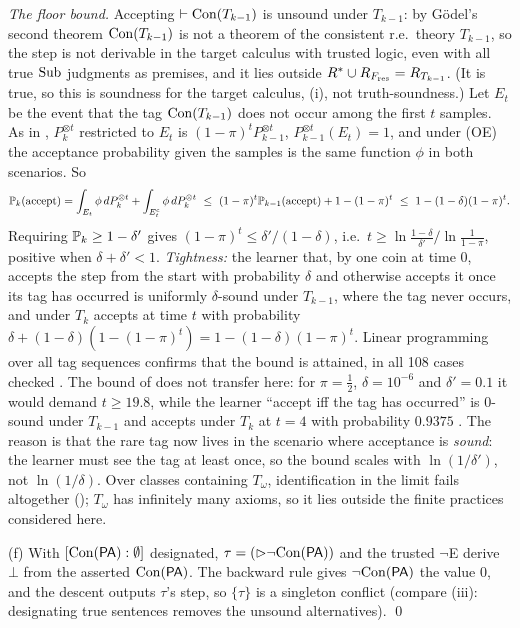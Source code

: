\emph{The floor bound.} Accepting $\vdash\mathrm{Con}(T_{k-1})$ is unsound under $T_{k-1}$: by G\"odel's second theorem $\mathrm{Con}(T_{k-1})$ is not a theorem of the consistent r.e.\ theory $T_{k-1}$, so the step is not derivable in the target calculus with trusted logic, even with all true $\mathrm{Sub}$ judgments as premises, and it lies outside $R^{*}\cup R_{F_{\mathrm{res}}}=R_{T_{k-1}}$. (It is true, so this is soundness for the target calculus, (i), not truth-soundness.) Let $E_t$ be the event that the tag $\mathrm{Con}(T_{k-1})$ does not occur among the first $t$ samples. As in , $P_k^{\otimes t}$ restricted to $E_t$ is $(1-\pi)^tP_{k-1}^{\otimes t}$, $P_{k-1}^{\otimes t}(E_t)=1$, and under (OE) the acceptance probability given the samples is the same function $\phi$ in both scenarios. So
\[
\Prob_k(\text{accept})=\int_{E_t}\phi\,dP_k^{\otimes t}+\int_{E_t^c}\phi\,dP_k^{\otimes t}\ \le\ (1-\pi)^t\Prob_{k-1}(\text{accept})+1-(1-\pi)^t\ \le\ 1-(1-\delta)(1-\pi)^t .
\]
Requiring $\mathbb{P}_k\ge1-\delta'$ gives $(1-\pi)^t\le\delta'/(1-\delta)$, i.e.\ $t\ge\ln\frac{1-\delta}{\delta'}\big/\ln\frac1{1-\pi}$, positive when $\delta+\delta'<1$. \emph{Tightness:} the learner that, by one coin at time $0$, accepts the step from the start with probability $\delta$ and otherwise accepts it once its tag has occurred is uniformly $\delta$-sound under $T_{k-1}$, where the tag never occurs, and under $T_k$ accepts at time $t$ with probability $\delta+(1-\delta)(1-(1-\pi)^t)=1-(1-\delta)(1-\pi)^t$. Linear programming over all tag sequences confirms that the bound is attained, in all 108 cases checked . The bound of  does not transfer here: for $\pi=\frac12$, $\delta=10^{-6}$ and $\delta'=0.1$ it would demand $t\ge19.8$, while the learner ``accept iff the tag has occurred'' is $0$-sound under $T_{k-1}$ and accepts under $T_k$ at $t=4$ with probability $0.9375$ . The reason is that the rare tag now lives in the scenario where acceptance is \emph{sound}: the learner must see the tag at least once, so the bound scales with $\ln(1/\delta')$, not $\ln(1/\delta)$. Over classes containing $T_\omega$, identification in the limit fails altogether (); $T_\omega$ has infinitely many axioms, so it lies outside the finite practices considered here.

(f) With $[\mathrm{Con}(\mathsf{PA}) : \emptyset]$ designated, $\tau=(\rhd\neg\mathrm{Con}(\mathsf{PA}))$ and the trusted $\neg$E derive $\bot$ from the asserted $\mathrm{Con}(\mathsf{PA})$. The backward rule gives $\neg\mathrm{Con}(\mathsf{PA})$ the value $0$, and the descent outputs $\tau$'s step, so $\{\tau\}$ is a singleton conflict (compare (iii): designating true sentences removes the unsound alternatives). \qed

